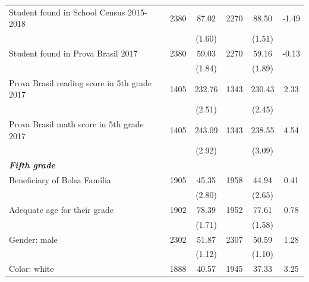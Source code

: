 \documentclass[
	article,			%
	12pt,				%
	oneside,			%
	a4paper,			%
	]{article}
\begin{document}
\begin{table}[h!]
\begin{tabular}{lccccc}
Student found in School Census 2015-2018 &       2380 &      87.02 &       2270 &      88.50 &      -1.49 \\

           &            &     (1.60) &            &     (1.51) &            \\

Student found in Prova Brasil 2017 &       2380 &      59.03 &       2270 &      59.16 &      -0.13 \\

           &            &     (1.84) &            &     (1.89) &            \\

Prova Brasil reading score in 5th grade 2017 &       1405 &     232.76 &       1343 &     230.43 &       2.33 \\

           &            &     (2.51) &            &     (2.45) &            \\

Prova Brasil math score in 5th grade 2017 &       1405 &     243.09 &       1343 &     238.55 &       4.54 \\

           &            &     (2.92) &            &     (3.09) &            \\

{\it {\bf Fifth grade}} &            &            &            &            &            \\

Beneficiary of Bolsa Família &       1905 &      45.35 &       1958 &      44.94 &       0.41 \\

           &            &     (2.80) &            &     (2.65) &            \\

Adequate age for their grade &       1902 &      78.39 &       1952 &      77.61 &       0.78 \\

           &            &     (1.71) &            &     (1.58) &            \\

Gender: male &       2302 &      51.87 &       2307 &      50.59 &       1.28 \\

           &            &     (1.12) &            &     (1.10) &            \\

Color: white &       1888 &      40.57 &       1945 &      37.33 &       3.25 \\


\end{tabular}
\end{table}
\end{document}
